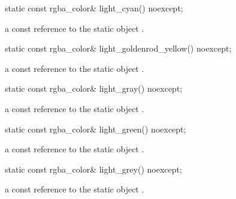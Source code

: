 \begin{itemdecl}
    static const rgba_color& light_cyan() noexcept;
\end{itemdecl}
\begin{itemdescr}
    \pnum
    \returns
    a const reference to the static  object .
\end{itemdescr}

\begin{itemdecl}
    static const rgba_color& light_goldenrod_yellow() noexcept;
\end{itemdecl}
\begin{itemdescr}
    \pnum
    \returns
    a const reference to the static  object .
\end{itemdescr}

\begin{itemdecl}
    static const rgba_color& light_gray() noexcept;
\end{itemdecl}
\begin{itemdescr}
    \pnum
    \returns
    a const reference to the static  object .
\end{itemdescr}

\begin{itemdecl}
    static const rgba_color& light_green() noexcept;
\end{itemdecl}
\begin{itemdescr}
    \pnum
    \returns
    a const reference to the static  object .
\end{itemdescr}

\begin{itemdecl}
    static const rgba_color& light_grey() noexcept;
\end{itemdecl}
\begin{itemdescr}
    \pnum
    \returns
    a const reference to the static  object .
\end{itemdescr}

